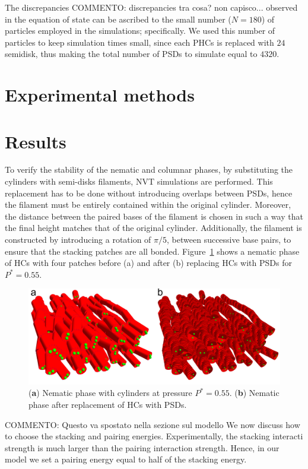 \documentclass[aip,jcp, amsmath, amssymb, reprint]{revtex4-1}
\begin{document}
The discrepancies {\color{red} COMMENTO: discrepancies tra cosa? non capisco...} observed in the equation of state can be ascribed to the small number ($N=180$) of particles employed in the simulations; specifically. We used this number of particles
to keep simulation times small, since each PHCs is replaced with $24$ semidisk, thus making the total number of PSDs to simulate equal to $4320$.

\section{\label{exp}Experimental methods}

\section{\label{Results}Results}
To verify the stability of the nematic and columnar phases, by substituting the cylinders with semi-disks filaments, NVT
simulations are performed. 
This replacement has to be done without introducing overlaps between PSDs, hence
the filament must be entirely contained within the original cylinder. Moreover,
the distance between the paired bases of the filament is chosen in such a way that the final 
height matches that of the original cylinder. Additionally, the filament is constructed by introducing a rotation of $\pi/5$, between successive base
pairs, to ensure that the stacking patches are all bonded. 
Figure~\ref{sosti1} shows a nematic phase of HCs with four patches before (a) and after (b)
replacing HCs with PSDs for $P^*=0.55$. 

\begin{figure}[h!]
\includegraphics[width=0.9\linewidth]{sosti1.png} 
\caption{\label{sosti1} (\textbf{a}) Nematic phase with cylinders at pressure $P^*=0.55$. (\textbf{b}) Nematic phase after replacement of HCs with PSDs. } 
\end{figure} 

{\color{red} COMMENTO: Questo va spostato nella sezione sul modello}
We now discuss how to choose the stacking and pairing energies. Experimentally, the stacking interacti
strength is much larger than the pairing interaction strength. 
Hence, in our model we set a pairing energy equal to half of the stacking energy.
\end{document}
